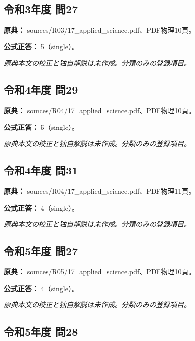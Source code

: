 \subsection{令和3年度 問27}
\label{q:r03-reg-applied-27}

\noindent\textbf{原典：} sources/R03/17\_applied\_science.pdf、PDF物理10頁。

\textbf{公式正答：} 5（single）。

\par\textit{原典本文の校正と独自解説は未作成。分類のみの登録項目。}

\subsection{令和4年度 問29}
\label{q:r04-reg-applied-29}

\noindent\textbf{原典：} sources/R04/17\_applied\_science.pdf、PDF物理10頁。

\textbf{公式正答：} 5（single）。

\par\textit{原典本文の校正と独自解説は未作成。分類のみの登録項目。}

\subsection{令和4年度 問31}
\label{q:r04-reg-applied-31}

\noindent\textbf{原典：} sources/R04/17\_applied\_science.pdf、PDF物理11頁。

\textbf{公式正答：} 4（single）。

\par\textit{原典本文の校正と独自解説は未作成。分類のみの登録項目。}

\subsection{令和5年度 問27}
\label{q:r05-reg-applied-27}

\noindent\textbf{原典：} sources/R05/17\_applied\_science.pdf、PDF物理10頁。

\textbf{公式正答：} 4（single）。

\par\textit{原典本文の校正と独自解説は未作成。分類のみの登録項目。}

\subsection{令和5年度 問28}
\label{q:r05-reg-applied-28}

